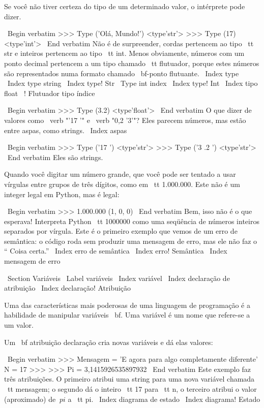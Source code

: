 \documentclass[10pt]{book}
\begin{document}
\begin {itemize}
{Se você não tiver certeza do tipo de um determinado valor, o intérprete pode dizer.

\ Begin {verbatim}
>>> Type ('Olá, Mundo!')
<type'str'>
>>> Type (17)
<type'int'>
\ End {verbatim}
%
Não é de surpreender, cordas pertencem ao tipo {\ tt str} e
inteiros pertencem ao tipo {\ tt int}. Menos obviamente, números
com um ponto decimal pertencem a um tipo chamado {\ tt flutuador},
porque estes números são representados numa
formato chamado {\ bf-ponto flutuante}.
\ Index {type}
\ Index {type string}
\ Index {type! Str}
\ {Type} int index
\ Index {type! Int}
\ Index {tipo float}
\ {!} Flutuador tipo índice

\ Begin {verbatim}
>>> Type (3.2)
<type'float'>
\ End {verbatim}
%
O que dizer de valores como \ verb "'17 '" e \ verb "0,2 '3'"?
Eles parecem números, mas estão entre aspas, como
strings.
\ Index {aspas}

\ Begin {verbatim}
>>> Type ('17 ')
<type'str'>
>>> Type ('3 .2 ')
<type'str'>
\ End {verbatim}
%
Eles são strings.

Quando você digitar um número grande, que você pode ser tentado a usar vírgulas
entre grupos de três dígitos, como em {\ tt 1.000.000}. Este não é um
integer legal em Python, mas é legal:

\ Begin {verbatim}
>>> 1.000.000
(1, 0, 0)
\ End {verbatim}
%
Bem, isso não é o que esperava! Interpreta Python {\ tt
  1000000} como uma seqüência de números inteiros separados por vírgula.
Este é o primeiro exemplo que vemos de um erro de semântica: o código
roda sem produzir uma mensagem de erro, mas ele não faz o
`` Coisa certa.''
\ Index {erro de semântica}
\ Index {erro! Semântica}
\ Index {mensagem de erro}



\ Section {Variáveis}
\ Label {variáveis}
\ Index {variável}
\ Index {declaração de atribuição}
\ Index {declaração! Atribuição}

Uma das características mais poderosas de uma linguagem de programação é a
habilidade de manipular variáveis ​​{\ bf}. Uma variável é um nome que
refere-se a um valor.

Um {\ bf atribuição declaração} cria novas variáveis ​​e dá
elas valores:

\ Begin {verbatim}
>>> Mensagem = 'E agora para algo completamente diferente'
N = 17 >>>
>>> Pi = 3,1415926535897932
\ End {verbatim}
%
Este exemplo faz três atribuições. O primeiro atribui uma string
para uma nova variável chamada {\ tt mensagem};
o segundo dá o inteiro {\ tt 17} para {\ tt n}, o terceiro
atribui o valor (aproximado) de $ \ pi $ a {\ tt pi}.
\ Index {diagrama de estado}
\ Index {diagrama! Estado}

}
\end{itemize}
\end{document}
